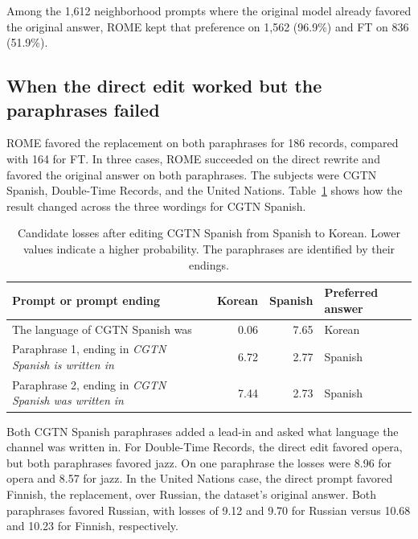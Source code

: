 \documentclass[11pt]{article}
\begin{document}
Among the 1,612 neighborhood prompts where the original model already favored the original answer, ROME kept that preference on 1,562 (96.9\%) and FT on 836 (51.9\%).

\subsection{When the direct edit worked but the paraphrases failed}
ROME favored the replacement on both paraphrases for 186 records, compared with 164 for FT. In three cases, ROME succeeded on the direct rewrite and favored the original answer on both paraphrases. The subjects were CGTN Spanish, Double-Time Records, and the United Nations. Table~\ref{tab:failures} shows how the result changed across the three wordings for CGTN Spanish.

\begin{table}[t]\centering\small
\begin{tabular}{@{}p{}rrl@{}}\toprule
Prompt or prompt ending & Korean & Spanish & Preferred answer\\\midrule
The language of CGTN Spanish was & 0.06 & 7.65 & Korean\\
Paraphrase 1, ending in \textit{CGTN Spanish is written in} & 6.72 & 2.77 & Spanish\\
Paraphrase 2, ending in \textit{CGTN Spanish was written in} & 7.44 & 2.73 & Spanish\\\bottomrule
\end{tabular}
\caption{Candidate losses after editing CGTN Spanish from Spanish to Korean. Lower values indicate a higher probability. The paraphrases are identified by their endings.}\label{tab:failures}
\end{table}

Both CGTN Spanish paraphrases added a lead-in and asked what language the channel was written in. For Double-Time Records, the direct edit favored opera, but both paraphrases favored jazz. On one paraphrase the losses were 8.96 for opera and 8.57 for jazz. In the United Nations case, the direct prompt favored Finnish, the replacement, over Russian, the dataset's original answer. Both paraphrases favored Russian, with losses of 9.12 and 9.70 for Russian versus 10.68 and 10.23 for Finnish, respectively.

\FloatBarrier
\end{document}
